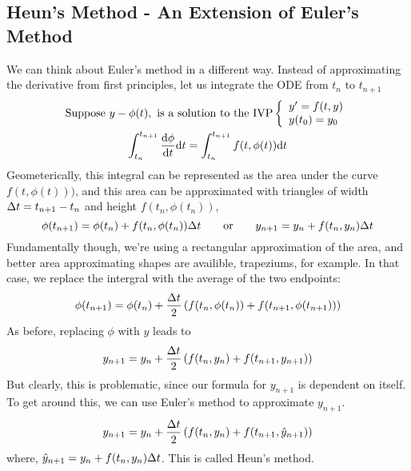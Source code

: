 \documentclass{report}
\begin{document}
\subsection*{Heun's Method - An Extension of Euler's Method}
We can think about Euler's method in a different way. Instead of approximating the derivative from first principles, let us integrate the ODE from $t_n$ to $t_{n+1}$
\begin{gather*}
	\Suppose y-\phi(t),\ \text{is a solution to the IVP} \left\lbrace\begin{array}{l} y' = f(t,y) \\ y(t_0) = y_0 \end{array} \right. \\
	\int_{t_n}^{t_{n+1}} \dyd[\phi]{t}\d t = \int_{t_n}^{t_{n+1}} f(t, \phi(t))\d t
\end{gather*}
Geometerically, this integral can be represented as the area under the curve $f(t,\phi(t)))$, and this area can be approximated with triangles of width $\D t = t_{n+1} - t_n$ and height $f(t_n, \phi(t_n))$,
$$
	\phi(t_{n+1}) = \phi(t_n) + f(t_n, \phi(t_n))\D t \qquad\text{or}\qquad y_{n+1} = y_n + f(t_n, y_n)\D t
$$
Fundamentally though, we're using a rectangular approximation of the area, and better area approximating shapes are availible, trapeziums, for example. In that case, we replace the intergral with the average of the two endpoints:
$$
	\phi(t_{n+1}) = \phi(t_n) + \frac{\D t}{2}\bracks{f(t_n, \phi(t_n)) + f(t_{n+1}, \phi(t_{n+1}))}
$$
As before, replacing $\phi$ with $y$ leads to
$$
	y_{n+1} = y_n + \frac{\D t}{2}\bracks{f(t_n, y_n) + f(t_{n+1}, y_{n+1})}
$$
But clearly, this is problematic, since our formula for $y_{n+1}$ is dependent on itself. To get around this, we can use Euler's method to approximate $y_{n+1}$.
$$
	y_{n+1} = y_{n} + \frac{\D t}{2}\bracks{f(t_n, y_n) + f(t_{n+1}, \hat{y}_{n+1})}
$$
where, $\hat{y}_{n+1} = y_n + f(t_n, y_n)\D t$. This is called Heun's method.
\end{document}
